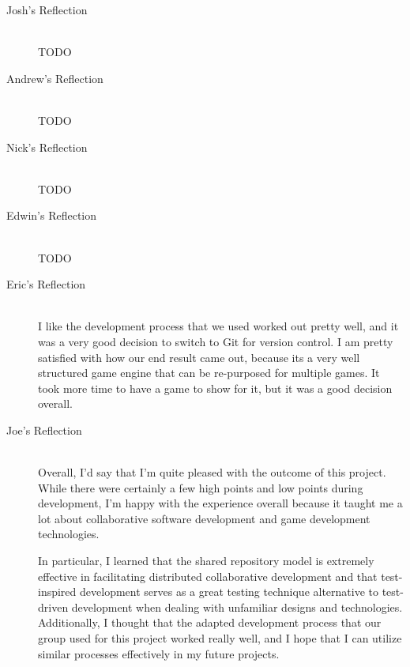 \documentclass{article}
\begin{document}
		\begin{description}
			\item[Josh's Reflection] \hfill \\
			TODO

			\item[Andrew's Reflection] \hfill \\
			TODO

			\item[Nick's Reflection] \hfill \\
			TODO

			\item[Edwin's Reflection] \hfill \\
			TODO

			\item[Eric's Reflection] \hfill \\
			I like the development process that we used worked out pretty well,
			and it was a very good decision to switch to Git for version control. I
			am pretty satisfied with how our end result came out, because its
			a very well structured game engine that can be re-purposed for multiple
			games. It took more time to have a game to show for it, but it was a
			good decision overall.

			\item[Joe's Reflection] \hfill \\
			Overall, I'd say that I'm quite pleased with the outcome of this
			project.  While there were certainly a few high points and low points
			during development, I'm happy with the experience overall because it
			taught me a lot about collaborative software development and game 
			development technologies.  
			
			In particular, I learned that the shared repository model is extremely 
			effective in facilitating distributed collaborative development and 
			that test-inspired development serves as a great testing technique 
			alternative to test-driven development when dealing with unfamiliar 
			designs and technologies.  Additionally, I thought that the adapted 
			development process that our group used for this project worked really 
			well, and I hope that I can utilize similar processes effectively 
			in my future projects.  		
	\end{description}
\end{document}
